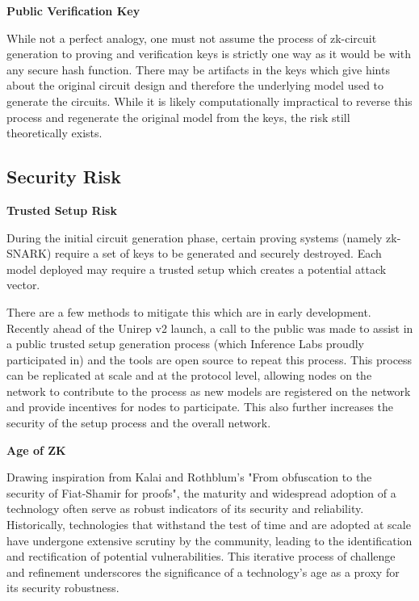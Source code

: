 \documentclass[conference]{IEEEtran}
\begin{document}
\noindent \textbf{Public Verification Key}

While not a perfect analogy, one must not assume the process of zk-circuit generation to proving and verification keys is strictly one way as it would be with any secure hash function. There may be artifacts in the keys which give hints about the original circuit design and therefore the underlying model used to generate the circuits. While it is likely computationally impractical to reverse this process and regenerate the original model from the keys, the risk still theoretically exists.

\subsection{Security Risk}
\noindent \textbf{Trusted Setup Risk}

During the initial circuit generation phase, certain proving systems (namely zk-SNARK) require a set of keys to be generated and securely destroyed. Each model deployed may require a trusted setup which creates a potential attack vector.

There are a few methods to mitigate this which are in early development. Recently ahead of the Unirep v2 launch, a call to the public was made to assist in a public trusted setup generation process (which Inference Labs proudly participated in) and the tools are open source to repeat this process. This process can be replicated at scale and at the protocol level, allowing nodes on the network to contribute to the process as new models are registered on the network and provide incentives for nodes to participate. This also further increases the security of the setup process and the overall network.

\noindent \textbf{Age of ZK}

Drawing inspiration from Kalai and Rothblum's "From obfuscation to the security of Fiat-Shamir for proofs", the maturity and widespread adoption of a technology often serve as robust indicators of its security and reliability. Historically, technologies that withstand the test of time and are adopted at scale have undergone extensive scrutiny by the community, leading to the identification and rectification of potential vulnerabilities. This iterative process of challenge and refinement underscores the significance of a technology's age as a proxy for its security robustness.
\end{document}
